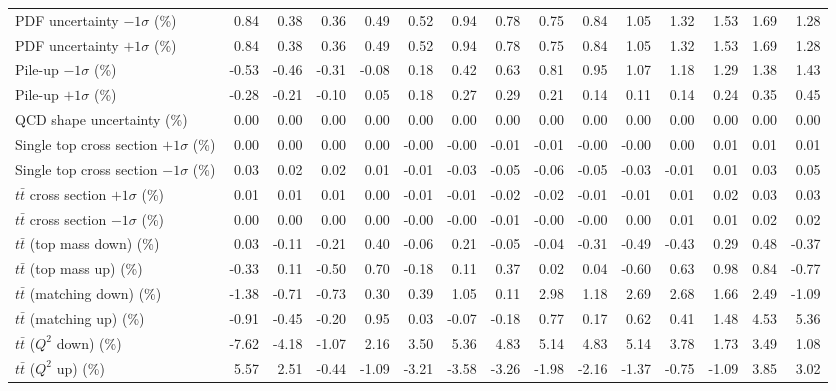 \begin{table}[htbp]
{\begin{tabular}{lrrrrrrrrrrrrrr}
PDF uncertainty $-1\sigma$ (\%) & 0.84 & 0.38 & 0.36 & 0.49 & 0.52 & 0.94 & 0.78 & 0.75 & 0.84 & 1.05 & 1.32 & 1.53 & 1.69 & 1.28 \\ 
PDF uncertainty $+1\sigma$ (\%) & 0.84 & 0.38 & 0.36 & 0.49 & 0.52 & 0.94 & 0.78 & 0.75 & 0.84 & 1.05 & 1.32 & 1.53 & 1.69 & 1.28 \\ 
Pile-up $-1\sigma$ (\%) & -0.53 & -0.46 & -0.31 & -0.08 & 0.18 & 0.42 & 0.63 & 0.81 & 0.95 & 1.07 & 1.18 & 1.29 & 1.38 & 1.43 \\ 
Pile-up $+1\sigma$ (\%) & -0.28 & -0.21 & -0.10 & 0.05 & 0.18 & 0.27 & 0.29 & 0.21 & 0.14 & 0.11 & 0.14 & 0.24 & 0.35 & 0.45 \\ 
QCD shape uncertainty (\%) & 0.00 & 0.00 & 0.00 & 0.00 & 0.00 & 0.00 & 0.00 & 0.00 & 0.00 & 0.00 & 0.00 & 0.00 & 0.00 & 0.00 \\ 
Single top cross section $+1\sigma$ (\%) & 0.00 & 0.00 & 0.00 & 0.00 & -0.00 & -0.00 & -0.01 & -0.01 & -0.00 & -0.00 & 0.00 & 0.01 & 0.01 & 0.01 \\ 
Single top cross section $-1\sigma$ (\%) & 0.03 & 0.02 & 0.02 & 0.01 & -0.01 & -0.03 & -0.05 & -0.06 & -0.05 & -0.03 & -0.01 & 0.01 & 0.03 & 0.05 \\ 
$t\bar{t}$ cross section $+1\sigma$ (\%) & 0.01 & 0.01 & 0.01 & 0.00 & -0.01 & -0.01 & -0.02 & -0.02 & -0.01 & -0.01 & 0.01 & 0.02 & 0.03 & 0.03 \\ 
$t\bar{t}$ cross section $-1\sigma$ (\%) & 0.00 & 0.00 & 0.00 & 0.00 & -0.00 & -0.00 & -0.01 & -0.00 & -0.00 & 0.00 & 0.01 & 0.01 & 0.02 & 0.02 \\ 
$t\bar{t}$ (top mass down) (\%) & 0.03 & -0.11 & -0.21 & 0.40 & -0.06 & 0.21 & -0.05 & -0.04 & -0.31 & -0.49 & -0.43 & 0.29 & 0.48 & -0.37 \\ 
$t\bar{t}$ (top mass up) (\%) & -0.33 & 0.11 & -0.50 & 0.70 & -0.18 & 0.11 & 0.37 & 0.02 & 0.04 & -0.60 & 0.63 & 0.98 & 0.84 & -0.77 \\ 
$t\bar{t}$ (matching down) (\%) & -1.38 & -0.71 & -0.73 & 0.30 & 0.39 & 1.05 & 0.11 & 2.98 & 1.18 & 2.69 & 2.68 & 1.66 & 2.49 & -1.09 \\ 
$t\bar{t}$ (matching up) (\%) & -0.91 & -0.45 & -0.20 & 0.95 & 0.03 & -0.07 & -0.18 & 0.77 & 0.17 & 0.62 & 0.41 & 1.48 & 4.53 & 5.36 \\ 
$t\bar{t}$ ($Q^{2}$ down) (\%) & -7.62 & -4.18 & -1.07 & 2.16 & 3.50 & 5.36 & 4.83 & 5.14 & 4.83 & 5.14 & 3.78 & 1.73 & 3.49 & 1.08 \\ 
$t\bar{t}$ ($Q^{2}$ up) (\%) & 5.57 & 2.51 & -0.44 & -1.09 & -3.21 & -3.58 & -3.26 & -1.98 & -2.16 & -1.37 & -0.75 & -1.09 & 3.85 & 3.02 \\ 

\end{tabular}}
\end{table}
